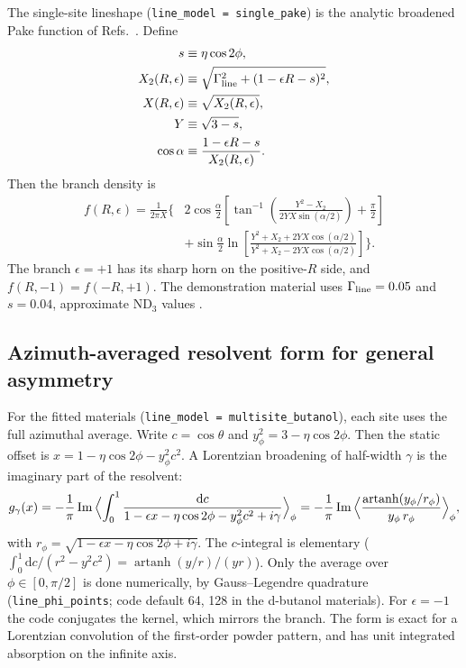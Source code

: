 \documentclass[11pt]{article}
\newcommand{\dd}{\mathrm{d}}
\newcommand{\code}[1]{\texttt{#1}}
\begin{document}
The single-site lineshape (\code{line\_model = single\_pake}) is the analytic broadened Pake
function of Refs.~\cite{Dulya1997,ClementKeller2023}. Define
\begin{align}
  s &\equiv \eta\cos 2\phi,\\
  X_2(R,\epsilon) &\equiv \sqrt{\Gamma_{\rm line}^2+(1-\epsilon R-s)^2},\\
  X(R,\epsilon) &\equiv \sqrt{X_2(R,\epsilon)},\\
  Y &\equiv \sqrt{3-s},\\
  \cos\alpha &\equiv \frac{1-\epsilon R-s}{X_2(R,\epsilon)}.
\end{align}
Then the branch density is
\begin{align}
 f(R,\epsilon)
 =\frac{1}{2\pi X}
 \Bigg\{&2\cos\frac{\alpha}{2}
 \left[
 \tan^{-1}\left(
 \frac{Y^2-X_2}{2YX\sin(\alpha/2)}
 \right)+\frac{\pi}{2}
 \right]
 \nonumber\\
 &+\sin\frac{\alpha}{2}
 \ln\left[
 \frac{Y^2+X_2+2YX\cos(\alpha/2)}
      {Y^2+X_2-2YX\cos(\alpha/2)}
 \right]\Bigg\}.
 \label{eq:analyticpake}
\end{align}
The branch \(\epsilon=+1\) has its sharp horn on the positive-\(R\) side, and
\(f(R,-1)=f(-R,+1)\). The demonstration material uses \(\Gamma_{\rm line}=0.05\) and
\(s=0.04\), approximate ND\(_3\) values \cite{ClementKeller2023}.

\subsection{Azimuth-averaged resolvent form for general asymmetry}
\label{sec:resolvent}

For the fitted materials (\code{line\_model = multisite\_butanol}), each site uses the full
azimuthal average. Write \(c=\cos\theta\) and \(y_\phi^2=3-\eta\cos2\phi\). Then the static
offset is \(x=1-\eta\cos2\phi-y_\phi^2c^2\). A Lorentzian broadening of half-width \(\gamma\) is
the imaginary part of the resolvent:
\begin{equation}
g_\gamma(x) = -\frac1\pi\,\mathrm{Im}\,\Bigl\langle\int_0^1\frac{\dd c}{1-\epsilon x-\eta\cos2\phi-y_\phi^2c^2+i\gamma}\Bigr\rangle_\phi
= -\frac1\pi\,\mathrm{Im}\,\Bigl\langle\frac{\operatorname{artanh}(y_\phi/r_\phi)}{y_\phi\,r_\phi}\Bigr\rangle_\phi,
\label{eq:resolvent}
\end{equation}
with \(r_\phi=\sqrt{1-\epsilon x-\eta\cos2\phi+i\gamma}\). The \(c\)-integral is elementary
(\(\int_0^1\dd c/(r^2-y^2c^2)=\operatorname{artanh}(y/r)/(yr)\)). Only the average over
\(\phi\in[0,\pi/2]\) is done numerically, by Gauss--Legendre quadrature
(\code{line\_phi\_points}; code default 64, 128 in the d-butanol materials). For \(\epsilon=-1\) the code conjugates the kernel, which
mirrors the branch. The form is exact for a Lorentzian convolution of the first-order powder
pattern, and has unit integrated absorption on the infinite axis.
\end{document}
